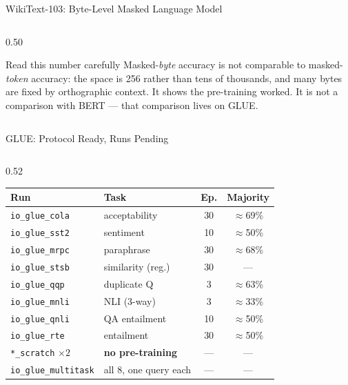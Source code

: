 \documentclass[aspectratio=169,11pt]{beamer}
\begin{document}
\begin{frame}[shrink=5]{WikiText-103: Byte-Level Masked Language Model}
\begin{columns}[T]
\begin{column}{0.50\textwidth}
      \vspace{0.3em}
      \begin{alertblock}{Read this number carefully}
        \scriptsize
        Masked-\emph{byte} accuracy is not comparable to masked-\emph{token} accuracy: the space is 256 rather than tens of thousands, and many bytes are fixed by orthographic context. It shows the pre-training worked. It is not a comparison with BERT --- that comparison lives on GLUE.
      \end{alertblock}
    \end{column}
  \end{columns}
\end{frame}

\begin{frame}[shrink=5]{GLUE: Protocol Ready, Runs Pending}
  \begin{columns}[T]
    \begin{column}{0.52\textwidth}
      \begin{table}
        \centering\scriptsize
        \begin{tabular}{llcc}
          \toprule
          \textbf{Run} & \textbf{Task} & \textbf{Ep.} & \textbf{Majority} \\
          \midrule
          \texttt{io\_glue\_cola} & acceptability & 30 & $\approx$69\% \\
          \texttt{io\_glue\_sst2} & sentiment & 10 & $\approx$50\% \\
          \texttt{io\_glue\_mrpc} & paraphrase & 30 & $\approx$68\% \\
          \texttt{io\_glue\_stsb} & similarity (reg.) & 30 & --- \\
          \texttt{io\_glue\_qqp} & duplicate Q & 3 & $\approx$63\% \\
          \texttt{io\_glue\_mnli} & NLI (3-way) & 3 & $\approx$33\% \\
          \texttt{io\_glue\_qnli} & QA entailment & 10 & $\approx$50\% \\
          \texttt{io\_glue\_rte} & entailment & 30 & $\approx$50\% \\
          \midrule
          \texttt{*\_scratch} $\times 2$ & \textbf{no pre-training} & --- & --- \\
          \texttt{io\_glue\_multitask} & all 8, one query each & --- & --- \\
          \bottomrule
        \end{tabular}
      \end{table}

\end{column}
\end{columns}
\end{frame}
\end{document}
